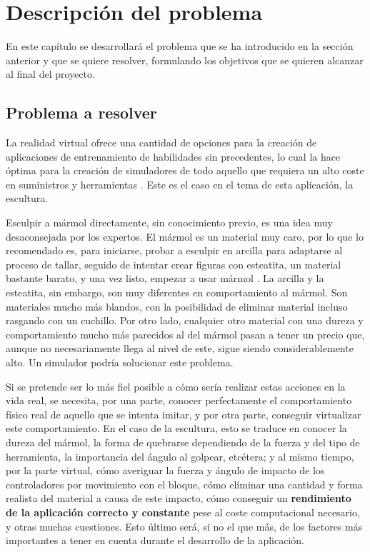 \chapter{Descripción del problema}

En este capítulo se desarrollará el problema que se ha introducido en la sección anterior y que se quiere resolver, formulando los objetivos que se quieren alcanzar al final del proyecto.

\section{Problema a resolver}

La realidad virtual ofrece una cantidad de opciones para la creación de aplicaciones de entrenamiento de habilidades sin precedentes, lo cual la hace óptima para la creación de simuladores de todo aquello que requiera un alto coste en suministros y herramientas \cite{skill_training}. Este es el caso en el tema de esta aplicación, la escultura.

Esculpir a mármol directamente, sin conocimiento previo, es una idea muy desaconsejada por los expertos. El mármol es un material muy caro, por lo que lo recomendado es, para iniciarse, probar a esculpir en arcilla para adaptarse al proceso de tallar, seguido de intentar crear figuras con esteatita, un material bastante barato, y una vez listo, empezar a usar mármol \cite{rich1988materials}. La arcilla y la esteatita, sin embargo, son muy diferentes en comportamiento al mármol. Son materiales mucho más blandos, con la posibilidad de eliminar material incluso rasgando con un cuchillo. Por otro lado, cualquier otro material con una dureza y comportamiento mucho más parecidos al del mármol pasan a tener un precio que, aunque no necesariamente llega al nivel de este, sigue siendo considerablemente alto. Un simulador podría solucionar este problema.

Si se pretende ser lo más fiel posible a cómo sería realizar estas acciones en la vida real, se necesita, por una parte, conocer perfectamente el comportamiento físico real de aquello que se intenta imitar, y por otra parte, conseguir virtualizar este comportamiento. En el caso de la escultura, esto se traduce en conocer la dureza del mármol, la forma de quebrarse dependiendo de la fuerza y del tipo de herramienta, la importancia del ángulo al golpear, etcétera; y al mismo tiempo, por la parte virtual, cómo averiguar la fuerza y ángulo de impacto de los controladores por movimiento con el bloque, cómo eliminar una cantidad y forma realista del material a causa de este impacto, cómo conseguir un \textbf{rendimiento de la aplicación correcto y constante} pese al coste computacional necesario, y otras muchas cuestiones. Esto último será, si no el que más, de los factores más importantes a tener en cuenta durante el desarrollo de la aplicación.

